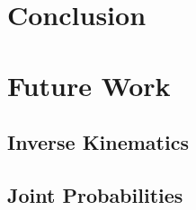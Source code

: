 \chapter{Conclusion}
\chapter{Future Work}
\section{Inverse Kinematics}
\section{Joint Probabilities}